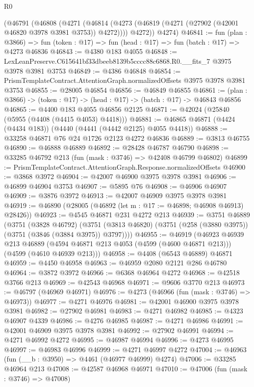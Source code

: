 \begin{lexlean}{R0}
\begin{coremodule}
    (@46791
      (@46808
        (@4271
          (@46814 (@4273 (@46819 (@4271 (@27902 (@42001 @46820 @3978 @3981 @3753)) @4272))))
          @4272))
      @4274)
@46841 := fun (plan : @3866) =>
  fun (token : @17) => fun (head : @17) => fun (batch : @17) => @4273 @46836
@46843 := @4380 @183 @4055
@46848 := LexLeanPreserve.C615641bf33dbeeb8139b5cccc88c6868.R0.__fits_7 @3975 @3978 @3981 @3753
@46849 := @4386 @46848
@46854 := PrismTemplateContract.AttentionGraph.normalizedOffsets @3975 @3978 @3981 @3753
@46855 := @28005 @46854
@46856 := @46849 @46855
@46861 := (plan : @3866) -> (token : @17) -> (head : @17) -> (batch : @17) -> @46843 @46856
@46865 := @4400 @183 @4055 @46856 @2125
@46871 := @42024 (@25840 (@5955 (@4408 (@4415 @4053) @4418)))
@46881 := @46865 @46871 (@4424 (@4434 @183)) (@4440 (@4441 (@4442 @2125) @4055 @4418))
@46888 := @33258 @46871 @76 @24 @1726 @2123 @4272 @46836
@46889 := @3813 @46755
@46890 := @46888 @46889
@46892 := @28428 @46787 @46790
@46898 := @33285 @46792 @213 (fun (mask : @3746) => @42408 @46799 @46802)
@46899 := PrismTemplateContract.AttentionGraph.Response.normalizedOffsets
@46900 := @3868 @3972
@46904 := @42007 @46900 @3975 @3978 @3981
@46906 := @46899 @46904 @3753
@46907 := @5895 @76
@46908 := @46906 @46907
@46909 := @3876 @3972
@46913 := @42007 @46909 @3975 @3978 @3981
@46919 := @46890 (@28005 (@46892 (let m : @17 := @46898; @46908 @46913) @28426))
@46923 := @4545 @46871 @231 @4272 @213
@46939 := @3751
    @46889
    (@3751
      (@3828 @46792)
      (@3751 (@3813 @46820) (@3751 (@258 (@3880 @3975)) (@3751 (@3846 (@3884 @3975)) @3797))))
@46955 := @46919
    (@46923
      @46939
      @213
      @46889
      (@4594 @46871 @213 @4053 (@4599 (@4600 @46871 @213)))
      (@4599 (@4610 @46939 @213)))
@46958 := @4408 (@6543 @46889) @46871
@46959 := @4450 @46958
@46963 := @46959 @2080 @2121 @286 @46780
@46964 := @3872 @3972
@46966 := @6368 @46964 @4272
@46968 := @42518 @3766 @213
@46969 := @42543 @46968
@46971 := @9606 @3770 @213
@46973 := @46797 (@46969 @46971)
@46976 := @4273 (@46966 (fun (mask : @3746) => @46973))
@46977 := @4271 @46976
@46981 := @42001 @46900 @3975 @3978 @3981
@46982 := @27902 @46981
@46983 := @4271 @46982
@46985 := @4323 @46907 @4339
@46986 := @4276 @46985
@46987 := @4271 @46986
@46991 := @42001 @46909 @3975 @3978 @3981
@46992 := @27902 @46991
@46994 := @4271 @46992 @4272
@46995 := @46987 @46994
@46996 := @4273 @46995
@46997 := @46983 @46996
@46999 := @4271 @46997 @4272
@47004 := @46963 (fun (__b : @3950) => @4461 (@46977 @46999) @4274)
@47006 := @33285 @46964 @213
@47008 := @42587 @46968 @46971
@47010 := @47006 (fun (mask : @3746) => @47008)

\end{coremodule}
\end{lexlean}
